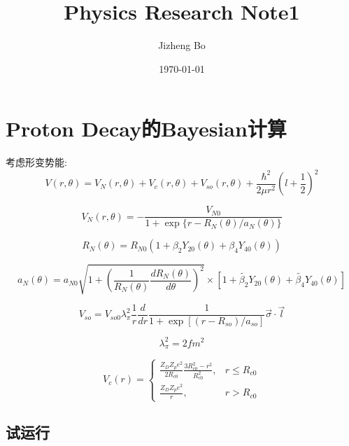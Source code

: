 \documentclass[11pt,a4paper,UTF8,scheme=plain,fontset=fandol]{ctexbook}
\title{Physics Research Note1}
\author{Jizheng Bo}
\date{\today}
\theoremstyle{definition}
\theoremstyle{plain}
\theoremstyle{remark}
\begin{document}
\maketitle
\tableofcontents
\newpage

\chapter{Proton Decay的Bayesian计算}

考虑形变势能:
\begin{equation}
    V(r,\theta)=V_N(r,\theta)+V_c(r,\theta)+V_{so}(r,\theta)+\frac{\hbar^2}{2\mu r^2}(l+\frac{1}{2})^2
\end{equation}

\begin{equation}
    V_N(r,\theta)=-\frac{V_{N0}}{1+\exp\{r-R_N(\theta)/a_N(\theta)\}}
\end{equation}

\begin{equation}
    R_N(\theta)=R_{N0}(1+\beta_2Y_{20}(\theta)+\beta_4Y_{40}(\theta))
\end{equation}

\begin{equation}
    a_N(\theta)=a_{N0}\sqrt{1+\left(\frac{1}{R_N(\theta)}\frac{dR_N(\theta)}{d\theta}\right)^2}\times \left[1+\tilde{\beta_2}Y_{20}(\theta)+\tilde{\beta_4}Y_{40}(\theta)\right]
\end{equation}

\begin{equation}
    V_{so}=V_{so0}\lambda_{\pi}^2\frac{1}{r}\frac{d}{dr}\frac{1}{1+\exp[(r-R_{so})/a_{so}]}\vec{\sigma}\cdot\vec{l}
\end{equation}

\begin{equation}
    \lambda_{\pi}^2=2 fm^2
\end{equation}

\begin{equation}
V_c(r)=
\begin{cases}
\frac{Z_D Z_p e^2}{2R_{c0}}\frac{3R_{c0}^2-r^2}{R_{c0}^2}, &r\leq R_{c0} \\
\frac{Z_D Z_pe^2}{r},&  r > R_{c0}
\end{cases}
\end{equation}


\section{试运行}
\end{document}
